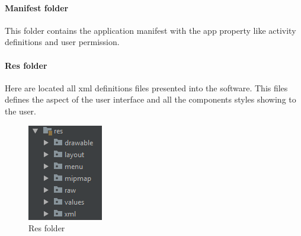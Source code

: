 \paragraph{Manifest folder}
This folder contains the application manifest with the app property like activity definitions and user permission. 

\paragraph{Res folder}
Here are located all xml definitions files presented into the software. This files defines the aspect of the user interface and all the components styles showing to the user.

\begin{figure}[H]
\includegraphics[width=\linewidth]{images/Res.png}
\caption{ Res folder }
\label{fig:pkgsharedata}
\end{figure}

